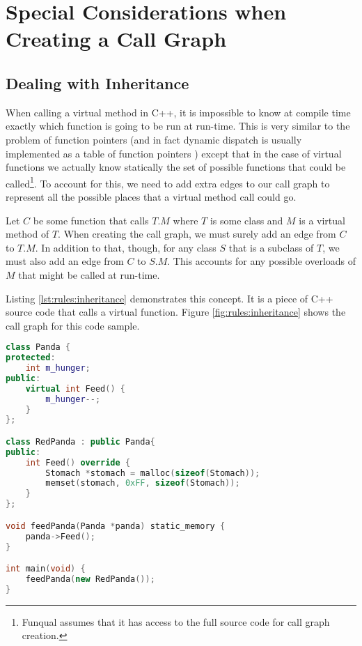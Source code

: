 \section{Special Considerations when Creating a Call Graph}\label{sec:rules:special}

\subsection{Dealing with Inheritance}\label{sec:rules:inherit}

When calling a virtual method in C++, it is impossible to know at compile time exactly which function is going to be run at run-time.  This is very similar to the problem of function pointers (and in fact dynamic dispatch is usually implemented as a table of function pointers \cite{language-standard}) except that in the case of virtual functions we actually know statically the set of possible functions that could be called\footnote{Funqual assumes that it has access to the full source code for call graph creation.}.  To account for this, we need to add extra edges to our call graph to represent all the possible places that a virtual method call could go.  

Let $C$ be some function that calls $T.M$ where $T$ is some class and $M$ is a virtual method of $T$.  When creating the call graph, we must surely add an edge from $C$ to $T.M$.  In addition to that, though, for any class $S$ that is a subclass of $T$, we must also add an edge from $C$ to $S.M$.  This accounts for any possible overloads of $M$ that might be called at run-time.

Listing \ref{lst:rules:inheritance} demonstrates this concept.  It is a piece of C++ source code that calls a virtual function.  Figure \ref{fig:rules:inheritance} shows the call graph for this code sample.  

\noindent\begin{minipage}[t]{\linewidth}
\begin{lstlisting}[language=C++,caption={Example C++ program demonstrating inheritance.  In \lstinline{feedPanda}, it is impossible to know statically which instance of the \lstinline{Feed} function will be called.  Figure \ref{fig:rules:inheritance} shows the call graph for this program.},label={lst:rules:inheritance}]
class Panda {
protected:
    int m_hunger;
public:
    virtual int Feed() {
        m_hunger--;
    }
};

class RedPanda : public Panda{
public:
    int Feed() override {
        Stomach *stomach = malloc(sizeof(Stomach));
        memset(stomach, 0xFF, sizeof(Stomach));
    }
};

void feedPanda(Panda *panda) static_memory {
    panda->Feed();
}

int main(void) {
    feedPanda(new RedPanda());
}
\end{lstlisting}
\end{minipage}

